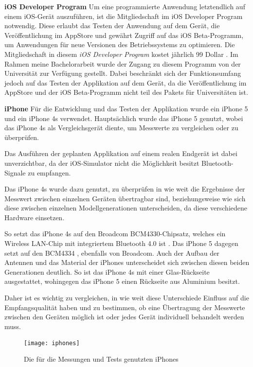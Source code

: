 \textbf{iOS Developer Program}
Um eine programmierte Anwendung letztendlich auf einem iOS-Gerät auszuführen, ist die Mitgliedschaft im iOS Developer Program notwendig.
Diese erlaubt das Testen der Anwendung auf dem Gerät, die Veröffentlichung im AppStore und gewährt Zugriff auf das iOS Beta-Programm, um Anwendungen für neue Versionen des Betriebssystems zu optimieren.
Die Mitgliedschaft in diesem \emph{iOS Developer Program} kostet jährlich 99 Dollar \cite{iosdevprog}. 
Im Rahmen meine Bachelorarbeit wurde der Zugang zu diesem Programm von der Universität zur Verfügung gestellt. Dabei beschränkt sich der Funktionsumfang jedoch auf das Testen der Applikation auf dem Gerät, da die Veröffentlichung im AppStore und der iOS Beta-Programm nicht teil des Pakets für Universitäten ist.

\textbf{iPhone}
Für die Entwicklung und das Testen der Applikation wurde ein iPhone 5 und ein iPhone 4s verwendet. 
Hauptsächlich wurde das iPhone 5 genutzt, wobei das iPhone 4s als Vergleichsgerät diente, um Messwerte zu vergleichen oder zu überprüfen.

Das Ausführen der geplanten Applikation auf einem realen Endgerät ist dabei unverzichtbar, da der iOS-Simulator nicht die Möglichkeit besitzt Bluetooth-Signale zu empfangen.

Das iPhone 4s wurde dazu genutzt, zu überprüfen in wie weit die Ergebnisse der Messwert zwischen einzelnen Geräten übertragbar sind, beziehungsweise wie sich diese zwischen einzelnen Modellgenerationen unterscheiden, da diese verschiedene Hardware einsetzen. 

So setzt das iPhone 4s auf den Broadcom BCM4330-Chipsatz, welches ein Wireless LAN-Chip mit integriertem Bluetooth 4.0 ist \cite{iPhone4sTeardown}. Das iPhone 5 dagegen setzt auf den BCM4334 \cite{iPhone5Teardown}, ebenfalls von Broadcom. 
Auch der Aufbau der Antennen und das Material der iPhones unterscheidet sich zwischen diesen beiden Generationen deutlich. 
So ist das iPhone 4s mit einer Glas-Rückseite ausgestattet, wohingegen das iPhone 5 einen Rückseite aus Aluminium besitzt.

Daher ist es wichtig zu vergleichen, in wie weit diese Unterschiede Einfluss auf die Empfangsqualität haben und zu bestimmen, ob eine Übertragung der Messwerte zwischen den Geräten möglich ist oder jedes Gerät individuell behandelt werden muss.

\begin{figure}[htb!]
		\centering
	\texttt{[image: iphones]}
	\caption{Die für die Messungen und Tests genutzten iPhones}
	\label{iphones}
\end{figure}

